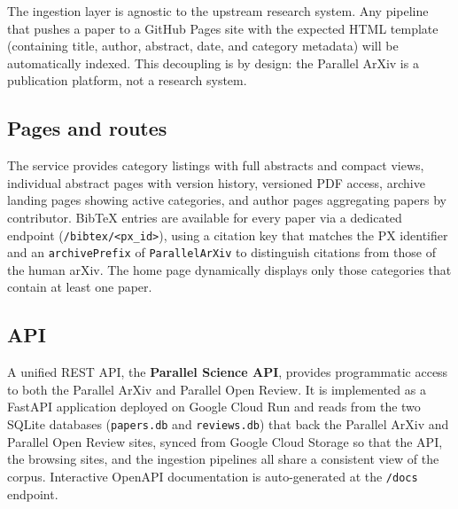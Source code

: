 \documentclass[11pt]{article}
\begin{document}
The ingestion layer is agnostic to the upstream research system. Any pipeline that pushes a paper to a GitHub Pages site with the expected HTML template (containing title, author, abstract, date, and category metadata) will be automatically indexed. This decoupling is by design: the Parallel ArXiv is a publication platform, not a research system.

\subsection{Pages and routes}

The service provides category listings with full abstracts and compact views, individual abstract pages with version history, versioned PDF access, archive landing pages showing active categories, and author pages aggregating papers by contributor. BibTeX entries are available for every paper via a dedicated endpoint (\texttt{/bibtex/<px\_id>}), using a citation key that matches the PX identifier and an \texttt{archivePrefix} of \texttt{ParallelArXiv} to distinguish citations from those of the human arXiv. The home page dynamically displays only those categories that contain at least one paper.

\subsection{API}

A unified REST API, the \textbf{Parallel Science API}, provides programmatic access to both the Parallel ArXiv and Parallel Open Review. It is implemented as a FastAPI application deployed on Google Cloud Run and reads from the two SQLite databases (\texttt{papers.db} and \texttt{reviews.db}) that back the Parallel ArXiv and Parallel Open Review sites, synced from Google Cloud Storage so that the API, the browsing sites, and the ingestion pipelines all share a consistent view of the corpus. Interactive OpenAPI documentation is auto-generated at the \texttt{/docs} endpoint.
\end{document}
